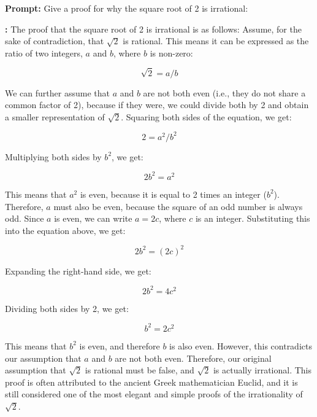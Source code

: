 \begin{tcolorbox}
\textbf{Prompt:} Give a proof for why the square root of 2 is irrational:
\vspace{1em}

\textbf{\qt:} 
The proof that the square root of 2 is irrational is as follows: Assume, for the sake of contradiction, that $\sqrt{2}$ is rational. This means it can be expressed as the ratio of two integers, $a$ and $b$, where $b$ is non-zero:

$$\sqrt{2} = a/b$$

We can further assume that $a$ and $b$ are not both even (i.e., they do not share a common factor of 2), because if they were, we could divide both by 2 and obtain a smaller representation of $\sqrt{2}$. Squaring both sides of the equation, we get:

$$2 = a^2/b^2$$

Multiplying both sides by $b^2$, we get:

$$2b^2 = a^2$$

This means that $a^2$ is even, because it is equal to 2 times an integer ($b^2$). Therefore, $a$ must also be even, because the square of an odd number is always odd.
Since $a$ is even, we can write $a = 2c$, where $c$ is an integer. Substituting this into the equation above, we get:

$$2b^2 = (2c)^2$$

Expanding the right-hand side, we get:

$$2b^2 = 4c^2$$

Dividing both sides by 2, we get:

$$b^2 = 2c^2$$

This means that $b^2$ is even, and therefore $b$ is also even.
However, this contradicts our assumption that $a$ and $b$ are not both even. Therefore, our original assumption that $\sqrt{2}$ is rational must be false, and $\sqrt{2}$ is actually irrational.
This proof is often attributed to the ancient Greek mathematician Euclid, and it is still considered one of the most elegant and simple proofs of the irrationality of $\sqrt{2}$.
\end{tcolorbox}